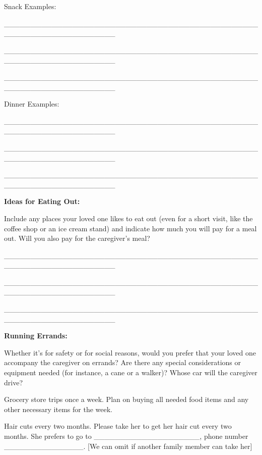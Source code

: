 \documentclass[]{article}
\begin{document}
Snack Examples:

\_\_\_\_\_\_\_\_\_\_\_\_\_\_\_\_\_\_\_\_\_\_\_\_\_\_\_\_\_\_\_\_\_\_\_\_\_\_\_\_\_\_\_\_\_\_\_\_\_\_\_\_\_\_\_\_\_\_\_\_\_\_\_\_\_\_\_\_\_

\_\_\_\_\_\_\_\_\_\_\_\_\_\_\_\_\_\_\_\_\_\_\_\_\_\_\_\_\_\_\_\_\_\_\_\_\_\_\_\_\_\_\_\_\_\_\_\_\_\_\_\_\_\_\_\_\_\_\_\_\_\_\_\_\_\_\_\_\_

\_\_\_\_\_\_\_\_\_\_\_\_\_\_\_\_\_\_\_\_\_\_\_\_\_\_\_\_\_\_\_\_\_\_\_\_\_\_\_\_\_\_\_\_\_\_\_\_\_\_\_\_\_\_\_\_\_\_\_\_\_\_\_\_\_\_\_\_\_

Dinner Examples:

\_\_\_\_\_\_\_\_\_\_\_\_\_\_\_\_\_\_\_\_\_\_\_\_\_\_\_\_\_\_\_\_\_\_\_\_\_\_\_\_\_\_\_\_\_\_\_\_\_\_\_\_\_\_\_\_\_\_\_\_\_\_\_\_\_\_\_\_\_

\_\_\_\_\_\_\_\_\_\_\_\_\_\_\_\_\_\_\_\_\_\_\_\_\_\_\_\_\_\_\_\_\_\_\_\_\_\_\_\_\_\_\_\_\_\_\_\_\_\_\_\_\_\_\_\_\_\_\_\_\_\_\_\_\_\_\_\_\_

\_\_\_\_\_\_\_\_\_\_\_\_\_\_\_\_\_\_\_\_\_\_\_\_\_\_\_\_\_\_\_\_\_\_\_\_\_\_\_\_\_\_\_\_\_\_\_\_\_\_\_\_\_\_\_\_\_\_\_\_\_\_\_\_\_\_\_\_\_

\textbf{Ideas for Eating Out:}

Include any places your loved one likes to eat out (even for a short
visit, like the coffee shop or an ice cream stand) and indicate how much
you will pay for a meal out. Will you also pay for the caregiver's meal?

\_\_\_\_\_\_\_\_\_\_\_\_\_\_\_\_\_\_\_\_\_\_\_\_\_\_\_\_\_\_\_\_\_\_\_\_\_\_\_\_\_\_\_\_\_\_\_\_\_\_\_\_\_\_\_\_\_\_\_\_\_\_\_\_\_\_\_\_\_

\_\_\_\_\_\_\_\_\_\_\_\_\_\_\_\_\_\_\_\_\_\_\_\_\_\_\_\_\_\_\_\_\_\_\_\_\_\_\_\_\_\_\_\_\_\_\_\_\_\_\_\_\_\_\_\_\_\_\_\_\_\_\_\_\_\_\_\_\_

\_\_\_\_\_\_\_\_\_\_\_\_\_\_\_\_\_\_\_\_\_\_\_\_\_\_\_\_\_\_\_\_\_\_\_\_\_\_\_\_\_\_\_\_\_\_\_\_\_\_\_\_\_\_\_\_\_\_\_\_\_\_\_\_\_\_\_\_\_

\textbf{Running Errands:}

Whether it's for safety or for social reasons, would you prefer that
your loved one accompany the caregiver on errands? Are there any special
considerations or equipment needed (for instance, a cane or a walker)?
Whose car will the caregiver drive?

Grocery store trips once a week. Plan on buying all needed food items
and any other necessary items for the week.

Hair cuts every two months. Please take her to get her hair cut every
two months. She prefers to go to
\_\_\_\_\_\_\_\_\_\_\_\_\_\_\_\_\_\_\_\_, phone number
\_\_\_\_\_\_\_\_\_\_\_\_\_\_\_. {[}We can omit if another family member
can take her{]}
\end{document}
